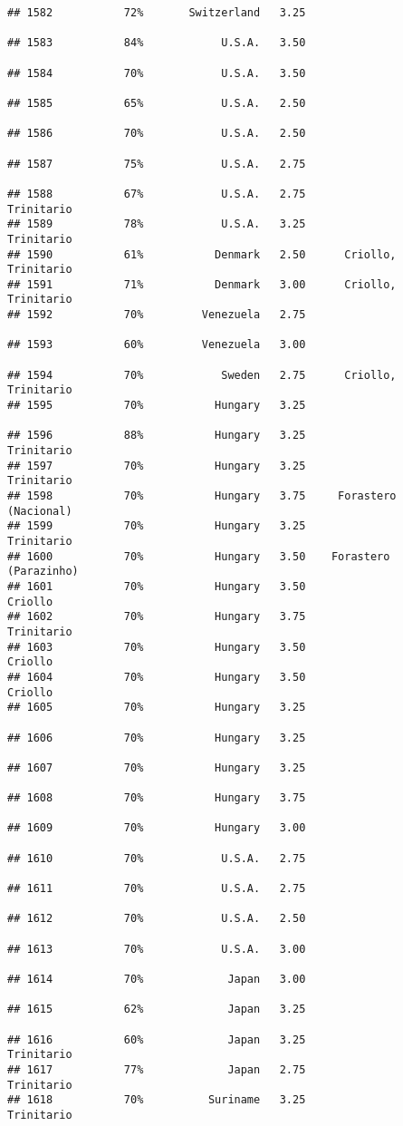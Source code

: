 \documentclass[
]{article}
\begin{document}
\begin{verbatim}
## 1582           72%       Switzerland   3.25                         
## 1583           84%            U.S.A.   3.50                         
## 1584           70%            U.S.A.   3.50                         
## 1585           65%            U.S.A.   2.50                         
## 1586           70%            U.S.A.   2.50                         
## 1587           75%            U.S.A.   2.75                         
## 1588           67%            U.S.A.   2.75               Trinitario
## 1589           78%            U.S.A.   3.25               Trinitario
## 1590           61%           Denmark   2.50      Criollo, Trinitario
## 1591           71%           Denmark   3.00      Criollo, Trinitario
## 1592           70%         Venezuela   2.75                         
## 1593           60%         Venezuela   3.00                         
## 1594           70%            Sweden   2.75      Criollo, Trinitario
## 1595           70%           Hungary   3.25                         
## 1596           88%           Hungary   3.25               Trinitario
## 1597           70%           Hungary   3.25               Trinitario
## 1598           70%           Hungary   3.75     Forastero (Nacional)
## 1599           70%           Hungary   3.25               Trinitario
## 1600           70%           Hungary   3.50    Forastero (Parazinho)
## 1601           70%           Hungary   3.50                  Criollo
## 1602           70%           Hungary   3.75               Trinitario
## 1603           70%           Hungary   3.50                  Criollo
## 1604           70%           Hungary   3.50                  Criollo
## 1605           70%           Hungary   3.25                         
## 1606           70%           Hungary   3.25                         
## 1607           70%           Hungary   3.25                         
## 1608           70%           Hungary   3.75                         
## 1609           70%           Hungary   3.00                         
## 1610           70%            U.S.A.   2.75                         
## 1611           70%            U.S.A.   2.75                         
## 1612           70%            U.S.A.   2.50                         
## 1613           70%            U.S.A.   3.00                         
## 1614           70%             Japan   3.00                         
## 1615           62%             Japan   3.25                         
## 1616           60%             Japan   3.25               Trinitario
## 1617           77%             Japan   2.75               Trinitario
## 1618           70%          Suriname   3.25               Trinitario

\end{verbatim}
\end{document}
